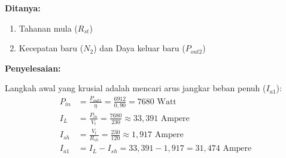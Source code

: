 \documentclass[12pt, a4paper]{article}
\begin{document}
\textbf{Ditanya:}
\begin{enumerate}[label=\alph*.]
    \item Tahanan mula ($R_{st}$)
    \item Kecepatan baru ($N_2$) dan Daya keluar baru ($P_{out2}$)
\end{enumerate}

\textbf{Penyelesaian:}

Langkah awal yang krusial adalah mencari arus jangkar beban penuh ($I_{a1}$):
\begin{align*}
    P_{in} &= \frac{P_{out1}}{\eta} = \frac{6912}{0,90} = 7680 \text{ Watt} \\
    I_L &= \frac{P_{in}}{V_t} = \frac{7680}{230} \approx 33,391 \text{ Ampere} \\
    I_{sh} &= \frac{V_t}{R_{sh}} = \frac{230}{120} \approx 1,917 \text{ Ampere} \\
    I_{a1} &= I_L - I_{sh} = 33,391 - 1,917 = 31,474 \text{ Ampere}
\end{align*}
\end{document}
